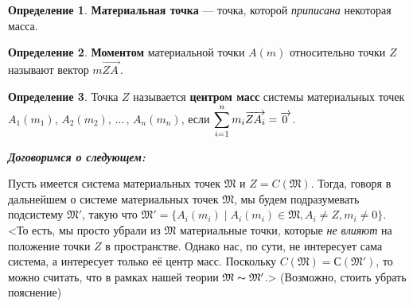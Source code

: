 \documentclass[14pt]{extarticle}
\let\Overrightarrow\overrightarrow
\let\vecarrow\overrightarrow
\theoremstyle{definition}
\newtheorem*{definition}{Определение}
\theoremstyle{theorem}
\begin{document}

\begin{definition}
\noindent \textbf{Материальная точка} --- точка, которой 
\textit{приписана} некоторая масса.
\end{definition}

\begin{definition}
\noindent \textbf{Моментом} материальной точки $A(m)$ относительно 
точки $Z$ называют вектор $m \Overrightarrow{ZA_{\,}}$.
\end{definition}

\begin{definition}
\vspace{-3mm}
{
\noindent Точка $Z$ называется \textbf{центром масс} системы материальных 
точек $A_1(m_1), \, A_2(m_2), \, ... \, , \, A_n(m_n)$, 
если $\mathlarger{\sum_{i=1}^{n} m_i \Overrightarrow{ZA_i} = \vecarrow{0_{\,}}}$.
\par}
\vspace{3mm}
\end{definition}



\begin{framed}
\noindent\textbf{\textit{Договоримся о следующем:}}

Пусть имеется система материальных точек  
\(\mathfrak{M}\) и 
\(Z = C(\mathfrak{M})\).
Тогда, говоря в дальнейшем о системе материальных точек
\(\mathfrak{M}\), %
мы будем подразумевать подсистему \(\mathfrak{M'}\), такую что 
\(\mathfrak{M'} = \big\{ A_i(m_i) \mid A_i(m_i) \in \mathfrak{M}, A_i \neq Z,
m_i \neq 0 \big\}\). 
<То есть, мы просто убрали из \(\mathfrak{M}\) материальные точки,
которые \textit{не влияют} на положение точки \(Z\) в пространстве.
Однако нас, по сути, не интересует сама система, а интересует  
только её центр масс. 
Поскольку \(C(\mathfrak{M}) = С(\mathfrak{M'})\), то можно считать,
что в рамках нашей теории \(\mathfrak{M} \thicksim \mathfrak{M'}\).>
(Возможно, стоить убрать пояснение)

\end{framed} 
\end{document}
